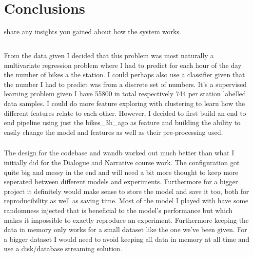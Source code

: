 \documentclass[a4paper]{article}
\begin{document}
    \section{Conclusions}\label{sec:conclusions}
    share any insights you gained about how the system works.

    \subsection*{}
    \subsubsection*{}
    From the data given I decided that this problem was most naturally a multivariate regression problem where I had to
    predict for each hour of the day the number of bikes a the station. I could perhaps also use a classifier given that
    the number I had to predict was from a discrete set of numbers. It's a supervised learning problem given I have 55800
    in total respectively 744 per station labelled data samples. I could do more feature exploring with clustering to
    learn how the different features relate to each other. However, I decided to first build an end to end pipeline using
    just the bikes\_3h\_ago as feature and building the ability to easily change the model and features as well as their
    pre-processing used.

    \subsubsection*{}
    The design for the codebase and wandb worked out much better than what I initially did for the Dialogue and Narrative
    course work. The configuration got quite big and messy in the end and will need a bit more thought to
    keep more seperated between different models and experiments. Furthermore for a bigger project it definitely would
    make sense to store the model and save it too, both for
    reproducibility as well as saving time. Most of the model I played with have some randomness injected that is
    beneficial to the model's performance but which makes it impossible to exactly reproduce an experiment. Furthermore
    keeping the data in memory only works for a small dataset like the one we've been given. For a bigger dataset I
    would need to avoid keeping all data in memory at all time and use a disk/database streaming solution.
\end{document}
